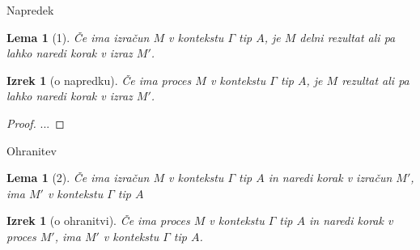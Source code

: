 \documentclass{beamer}
\theoremstyle{definition} %
\theoremstyle{plain} %
\newtheorem{lema}[definicija]{Lema}
\newtheorem{izrek}[definicija]{Izrek}
\begin{document}
	

	
	\begin{frame}{Napredek}
		\begin{lema}[1]
			Če ima izračun $M$ v kontekstu $\Gamma$ tip $A$, je $M$ delni rezultat ali pa lahko naredi korak v izraz $M'$.
		\end{lema}
		
		
					
		\begin{izrek}[o napredku]
			Če ima proces $M$ v kontekstu $\Gamma$ tip $A$, je $M$ rezultat ali pa lahko naredi korak v izraz $M'$.
		\end{izrek}
		
		\begin{proof}
			... 
		\end{proof}
		
	\end{frame}

	
		
	\begin{frame}{Ohranitev}
			
		\begin{lema}[2]
			Če ima izračun $M$ v kontekstu $\Gamma$ tip $A$ in naredi korak v izračun $M'$, ima $M'$ v kontekstu $\Gamma$ tip $A$
		\end{lema}	
				
		\begin{izrek}[o ohranitvi]
			Če ima proces $M$ v kontekstu $\Gamma$ tip $A$ in naredi korak v proces $M'$, ima $M'$ v kontekstu $\Gamma$ tip $A$.
		\end{izrek}
		
		
	\end{frame}
\end{document}
